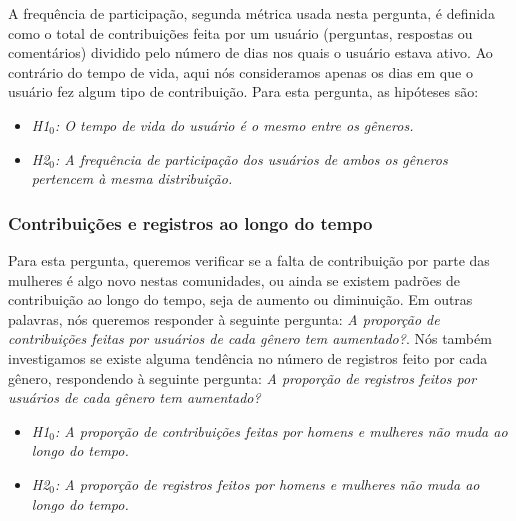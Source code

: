 A frequência de participação, segunda métrica usada nesta pergunta, é definida como o total de contribuições feita por um usuário (perguntas, respostas ou comentários) dividido pelo número de dias nos quais o usuário estava ativo. Ao contrário do tempo de vida, aqui nós consideramos apenas os dias em que o usuário fez algum tipo de contribuição. Para esta pergunta, as hipóteses são:

\begin{itemize}
    \item \textit{H1$_0$: O tempo de vida do usuário é o mesmo entre os gêneros.}
    \item \textit{H2$_0$: A frequência de participação dos usuários de ambos os gêneros pertencem à mesma distribuição.}
\end{itemize}

\subsubsection{Contribuições e registros ao longo do tempo}

Para esta pergunta, queremos verificar se a falta de contribuição por parte das mulheres é algo novo nestas comunidades, ou ainda se existem padrões de contribuição ao longo do tempo, seja de aumento ou diminuição. Em outras palavras, nós queremos responder à seguinte pergunta: \textit{A proporção de contribuições feitas por usuários de cada gênero tem aumentado?}. Nós também investigamos se existe alguma tendência no número de registros feito por cada gênero, respondendo à seguinte pergunta: \textit{A proporção de registros feitos por usuários de cada gênero tem aumentado?}

\begin{itemize}
    \item \textit{H1$_0$: A proporção de contribuições feitas por homens e mulheres não muda ao longo do tempo.}
    \item \textit{H2$_0$: A proporção de registros feitos por homens e mulheres não muda ao longo do tempo.}
\end{itemize}




